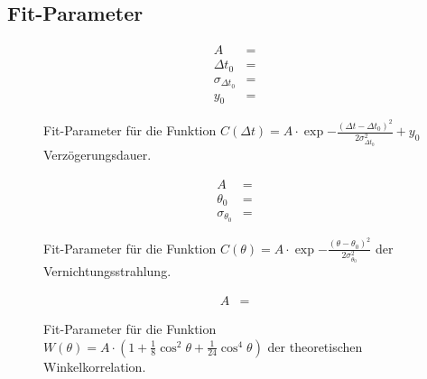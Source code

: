 \subsection{Fit-Parameter}
\label{sec:fitval}

\begin{figure}[H]
	\begin{align*}
		A &=  \\
		\Delta t_0 &=  \\
		\sigma_{\Delta t_0} &=  \\
		y_0 &= 
	\end{align*}
	\caption{Fit-Parameter für die Funktion $C(\Delta t) = A \cdot \exp{-\frac{(\Delta t - \Delta t_0)^2}{2 \sigma_{\Delta t_0}^2}} + y_0$ Verzögerungsdauer.}
	\label{fig:fitval1}
\end{figure}

\begin{figure}[H]
	\begin{align*}
	A &=  \\
	\theta_0 &=  \\
	\sigma_{\theta_0} &= 
	\end{align*}
	\caption{Fit-Parameter für die Funktion $C(\theta) = A \cdot \exp{-\frac{(\theta - \theta_0)^2}{2 \sigma_{\theta_0}^2}}$ der Vernichtungsstrahlung.}
	\label{fig:fitval3}
\end{figure}


\begin{figure}[H]
	\begin{align*}
	A &= 
	\end{align*}
	\caption{Fit-Parameter für die Funktion $W(\theta) = A \cdot \left( 1 + \frac{1}{8} \cos^2 \theta + \frac{1}{24} \cos^4 \theta \right)$ der theoretischen Winkelkorrelation.}
	\label{fig:fitval4}
\end{figure}
